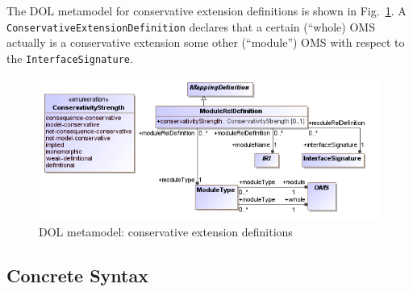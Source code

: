 \documentclass[10pt,fleqn,final]{scrreprt}
\newcommand*{\syntax}[1]{\texttt{#1}}
\newcommand{\ssclause}[1]{\subsection{#1}}
\newenvironment{definitions}[0]{\medskip }{}
\begin{document}
\begin{definitions}
The DOL metamodel for conservative extension definitions is shown in 
Fig.~\ref{fig:modules}.
A \syntax{ConservativeExtensionDefinition} declares that a certain (``whole) OMS
actually is a conservative extension some other (``module'') OMS with respect
to the \syntax{InterfaceSignature}.


\begin{figure}
  \centering
    \includegraphics[scale=0.47]{mof/modules.png}
  \caption{DOL metamodel: conservative extension definitions}
  \label{fig:modules}
\end{figure}






\ssclause{Concrete Syntax}\label{a:dol-text:mappings}

\vspace{-2em}
\begin{lstlisting}[language=ebnf,mathescape]


\end{lstlisting}
\end{definitions}
\end{document}
